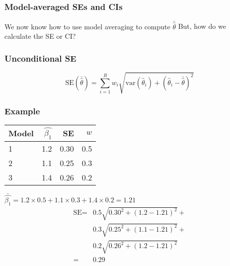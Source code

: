 \documentclass[color=usenames,dvipsnames]{beamer}\usepackage[]{graphicx}\usepackage[]{color}
\begin{document}
\begin{frame}
  \frametitle{Model-averaged SEs and CIs}
  \large
  {We now know how to use model averaging to compute $\bar{\hat{\theta}}$}
  \pause
  \vfill
  {But, how do we calculate the SE or CI?}
\end{frame}



\begin{frame}
  \frametitle{Unconditional SE}
  \Large
  \[
    \mbox{SE}(\bar{\hat{\theta}}) = \sum_{i=1}^R w_i \sqrt{\mbox{var}(\hat{\theta}_i) +
      (\hat{\theta}_i - \bar{\hat{\theta}})^2}
  \]
\end{frame}


\begin{frame}
  \frametitle{Example}
  \Large
  \begin{center}
    \begin{tabular}{lrrr}
      \hline
      Model & $\hat{\beta_1}$ & SE & $w$ \\
      \hline
      1 & 1.2 & 0.30 & 0.5 \\
      2 & 1.1 & 0.25 & 0.3 \\
      3 & 1.4 & 0.26 & 0.2 \\
      \hline
    \end{tabular}
  \end{center}
  \pause
  \large
  $\bar{\hat{\beta_1}} = 1.2\times0.5 + 1.1\times0.3 + 1.4\times0.2 = 1.21$
  \pause
  \begin{align*}
    \mbox{SE} = &0.5\sqrt{0.30^2 + (1.2-1.21)^2} + \\
                &0.3\sqrt{0.25^2 + (1.1-1.21)^2} + \\
                &0.2\sqrt{0.26^2 + (1.2-1.21)^2}   \\
              = &0.29
  \end{align*}
\end{frame}



\end{document}
